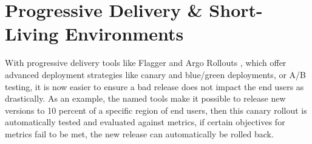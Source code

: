 \section{Progressive Delivery \& Short-Living Environments}

With progressive delivery tools like
Flagger
\autocite{flaggerWebsite}
and
Argo Rollouts
\autocite{argoRolloutsWebsite},
which offer advanced deployment strategies
like canary and blue/green deployments, or A/B testing,
it is now easier to ensure a bad release does not impact the end users
as drastically.
As an example, the named tools make it possible to release new versions
to 10 percent of a specific region of end users,
then this canary rollout is automatically tested and evaluated against metrics,
if certain objectives for metrics fail to be met,
the new release can automatically be rolled back.

